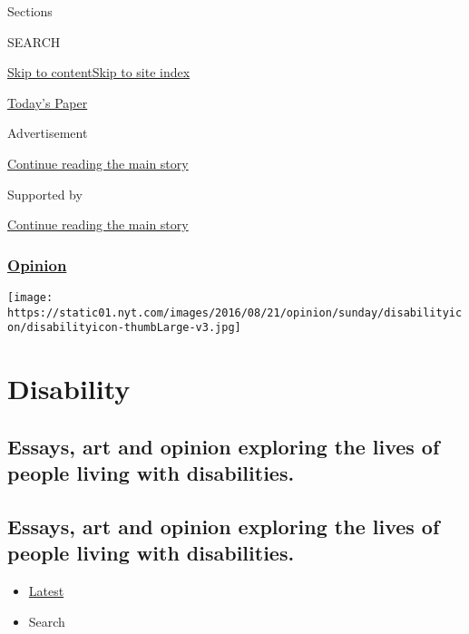 Sections

SEARCH

\protect\hyperlink{site-content}{Skip to
content}\protect\hyperlink{site-index}{Skip to site index}

\href{https://myaccount.nytimes.com/auth/login?response_type=cookie\&client_id=vi}{}

\href{https://www.nytimes.com/section/todayspaper}{Today's Paper}

Advertisement

\protect\hyperlink{after-top}{Continue reading the main story}

Supported by

\protect\hyperlink{after-sponsor}{Continue reading the main story}

\hypertarget{opinion}{%
\subsubsection{\texorpdfstring{\href{/section/opinion}{Opinion}}{Opinion}}\label{opinion}}

\texttt{[image: https://static01.nyt.com/images/2016/08/21/opinion/sunday/disabilityicon/disabilityicon-thumbLarge-v3.jpg]}

\hypertarget{disability}{%
\section{Disability}\label{disability}}

\hypertarget{essays-art-and-opinion-exploring-the-lives-of-people-living-with-disabilities}{%
\subsection{Essays, art and opinion exploring the lives of people living
with
disabilities.}\label{essays-art-and-opinion-exploring-the-lives-of-people-living-with-disabilities}}

\hypertarget{essays-art-and-opinion-exploring-the-lives-of-people-living-with-disabilities-1}{%
\subsection{Essays, art and opinion exploring the lives of people living
with
disabilities.}\label{essays-art-and-opinion-exploring-the-lives-of-people-living-with-disabilities-1}}

\begin{itemize}
\tightlist
\item
  \protect\hyperlink{stream-panel}{Latest}
\item
  Search
\end{itemize}

